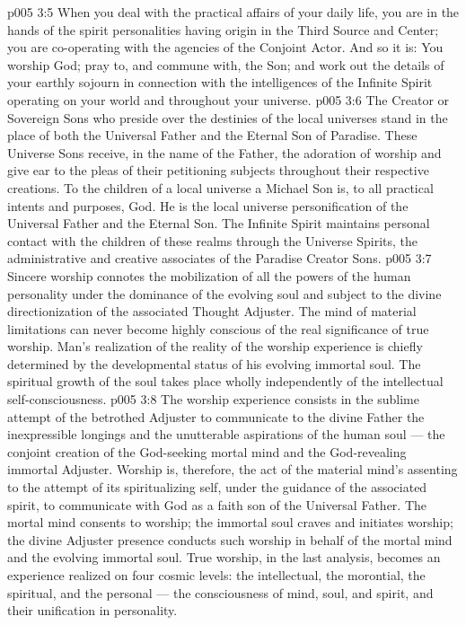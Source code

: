 \vs p005 3:5 When you deal with the practical affairs of your daily life, you are in the hands of the spirit personalities having origin in the Third Source and Center; you are co\hyp{}operating with the agencies of the Conjoint Actor. And so it is: You worship God; pray to, and commune with, the Son; and work out the details of your earthly sojourn in connection with the intelligences of the Infinite Spirit operating on your world and throughout your universe.
\vs p005 3:6 \pc The Creator or Sovereign Sons who preside over the destinies of the local universes stand in the place of both the Universal Father and the Eternal Son of Paradise. These Universe Sons receive, in the name of the Father, the adoration of worship and give ear to the pleas of their petitioning subjects throughout their respective creations. To the children of a local universe a Michael Son is, to all practical intents and purposes, God. He is the local universe personification of the Universal Father and the Eternal Son. The Infinite Spirit maintains personal contact with the children of these realms through the Universe Spirits, the administrative and creative associates of the Paradise Creator Sons.
\vs p005 3:7 \pc Sincere worship connotes the mobilization of all the powers of the human personality under the dominance of the evolving soul and subject to the divine directionization of the associated Thought Adjuster. The mind of material limitations can never become highly conscious of the real significance of true worship. Man’s realization of the reality of the worship experience is chiefly determined by the developmental status of his evolving immortal soul. The spiritual growth of the soul takes place wholly independently of the intellectual self\hyp{}consciousness.
\vs p005 3:8 The worship experience consists in the sublime attempt of the betrothed Adjuster to communicate to the divine Father the inexpressible longings and the unutterable aspirations of the human soul --- the conjoint creation of the God\hyp{}seeking mortal mind and the God\hyp{}revealing immortal Adjuster. Worship is, therefore, the act of the material mind’s assenting to the attempt of its spiritualizing self, under the guidance of the associated spirit, to communicate with God as a faith son of the Universal Father. The mortal mind consents to worship; the immortal soul craves and initiates worship; the divine Adjuster presence conducts such worship in behalf of the mortal mind and the evolving immortal soul. True worship, in the last analysis, becomes an experience realized on four cosmic levels: the intellectual, the morontial, the spiritual, and the personal --- the consciousness of mind, soul, and spirit, and their unification in personality.
